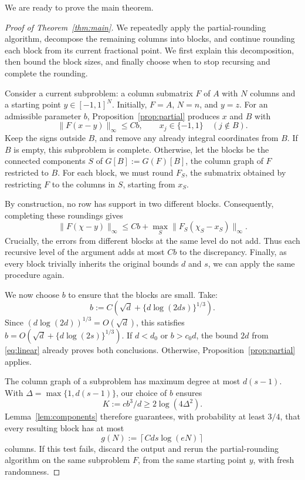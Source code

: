 \documentclass[10pt,a4paper]{amsart}
\newcommand{\norm}[1]{\lVert#1\rVert}
\begin{document}
We are ready to prove the main theorem.


\begin{proof}[Proof of Theorem~\ref{thm:main}]
We repeatedly apply the partial-rounding algorithm, decompose the remaining columns into blocks, and continue rounding each block from its current fractional point. We first explain this decomposition, then bound the block sizes, and finally choose when to stop recursing and complete the rounding.

Consider a current subproblem: a column submatrix $F$ of $A$ with $N$ columns and a starting point $y\in[-1,1]^N$. Initially, $F=A$, $N=n$, and $y=z$. For an admissible parameter $b$, Proposition~\ref{prop:partial} produces $x$ and $B$ with
\[ \norm{F(x-y)}_\infty\le Cb, \qquad x_j\in\{-1,1\}\quad(j\notin B). \]
Keep the signs outside $B$, and remove any already integral coordinates from $B$. If $B$ is empty, this subproblem is complete. Otherwise, let the blocks be the connected components $S$ of $G[B] := G(F)[B]$, the column graph of $F$ restricted to $B$. For each block, we must round $F_S$, the submatrix obtained by restricting $F$ to the columns in $S$, starting from $x_S$.

By construction, no row has support in two different blocks. Consequently, completing these roundings gives
\[ \norm{F(\chi-y)}_\infty \le Cb+\max_S \norm{F_{S}(\chi_S-x_S)}_\infty. \]
Crucially, the errors from different blocks at the same level do not add. Thus each recursive level of the argument adds at most $Cb$ to the discrepancy. Finally, as every block trivially inherits the original bounds $d$ and $s$, we can apply the same procedure again.

We now choose $b$ to ensure that the blocks are small. Take:
\begin{equation}\label{eq:b-choice} b:=C\left(\sqrt d+\{d\log(2ds)\}^{1/3}\right). \end{equation}
Since $(d\log(2d))^{1/3}=O(\sqrt d)$, this satisfies $b=O(\sqrt d+\{d\log(2s)\}^{1/3})$. If $d<d_0$ or $b>c_0d$, the bound $2d$ from \eqref{eq:linear} already proves both conclusions. Otherwise, Proposition~\ref{prop:partial} applies.

The column graph of a subproblem has maximum degree at most $d(s-1)$. With $\Delta=\max\{1,d(s-1)\}$, our choice of $b$ ensures
\[ K:=cb^3/d\ge2\log(4\Delta^2). \]
Lemma~\ref{lem:components} therefore guarantees, with probability at least $3/4$, that every resulting block has at most
\begin{equation}\label{eq:g} g(N):=\left\lceil Cds\log(eN)\right\rceil \end{equation}
columns. If this test fails, discard the output and rerun the partial-rounding algorithm on the same subproblem $F$, from the same starting point $y$, with fresh randomness.


\end{proof}
\end{document}
